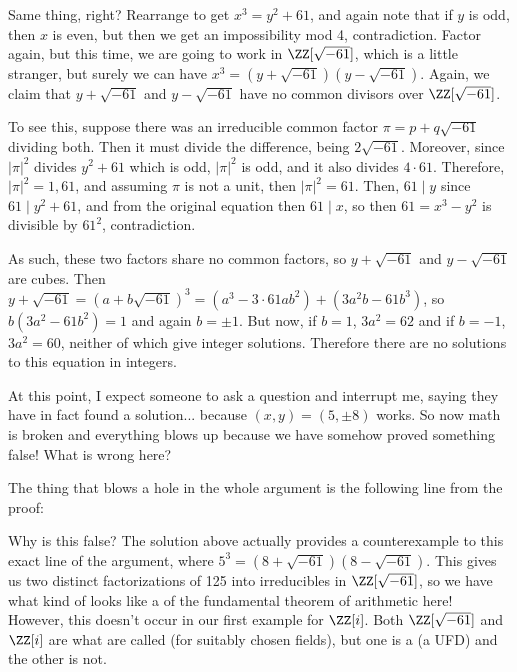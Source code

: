 \documentclass[12pt]{article}
\begin{document}
\begin{solution}
  Same thing, right? Rearrange to get $x^3 = y^2 + 61$, and again note that if
  $y$ is odd, then $x$ is even, but then we get an impossibility mod 4,
  contradiction. Factor again, but this time, we are going to work in
  $\ZZ[\sqrt{-61}]$, which is a little stranger, but surely we can have $x^3 =
  (y + \sqrt{-61})(y - \sqrt{-61})$. Again, we claim that $y + \sqrt{-61}$ and
  $y - \sqrt{-61}$ have no common divisors over $\ZZ[\sqrt{-61}]$. 

  To see this, suppose there was an irreducible common factor $\pi = p + q
  \sqrt{-61}$ dividing both. Then it must divide the difference, being $2
  \sqrt{-61}$. Moreover, since $|\pi|^2$ divides $y^2 + 61$ which is odd,
  $|\pi|^2$ is odd, and it also divides $4 \cdot 61$. Therefore, $|\pi|^2 = 1,
  61$, and assuming $\pi$ is not a unit, then $|\pi|^2 = 61$. Then, $61 \mid y$
  since $61 \mid y^2 + 61$, and from the original equation then $61 \mid x$, so
  then $61 = x^3 - y^2$ is divisible by $61^2$, contradiction. 

  As such, these two factors share no common factors, so $y + \sqrt{-61}$ and $y
  - \sqrt{-61}$ are cubes. Then $y+\sqrt{-61} = (a + b \sqrt{-61})^3 = (a^3 - 3
  \cdot 61 a b^2) + (3a^2 b - 61 b^3)$, so $b(3a^2 -61b^2) = 1$ and again $b =
  \pm 1$. But now, if $b = 1$, $3a^2 = 62$ and if $b = -1$, $3a^2 = 60$, neither
  of which give integer solutions. Therefore there are no solutions to this
  equation in integers.  
\end{solution}
\noindent At this point, I expect someone to ask a question and interrupt me,
saying they have in fact found a solution... because $(x, y) = (5, \pm 8)$ works. So now math is broken and everything blows up because we have
somehow proved something false! What is wrong here?  

The thing that blows a hole in the whole argument is the following line from the
proof:
\begin{center}
\end{center}
Why is this false? The solution above actually provides a counterexample to this
exact line of the argument, where $5^3 = (8 +
\sqrt{-61})(8 - \sqrt{-61})$. This gives us two distinct
factorizations of 125 into irreducibles in $\ZZ[\sqrt{-61}]$, so we have what
kind of looks like a  of the fundamental theorem of arithmetic
here! However, this doesn't occur in our first example for $\ZZ[i]$. Both
$\ZZ[\sqrt{-61}]$ and $\ZZ[i]$ are what are called  
(for suitably chosen fields), but one is a  (a
UFD) and the other is not. 
\end{document}
